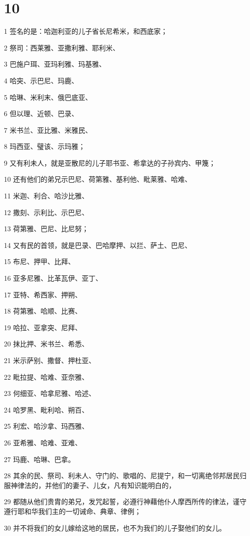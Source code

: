 \chapter{10}

\par 1 签名的是：哈迦利亚的儿子省长尼希米，和西底家；
\par 2 祭司：西莱雅、亚撒利雅、耶利米、
\par 3 巴施户珥、亚玛利雅、玛基雅、
\par 4 哈突、示巴尼、玛鹿、
\par 5 哈琳、米利末、俄巴底亚、
\par 6 但以理、近顿、巴录、
\par 7 米书兰、亚比雅、米雅民、
\par 8 玛西亚、璧该、示玛雅；
\par 9 又有利未人，就是亚散尼的儿子耶书亚、希拿达的子孙宾内、甲篾；
\par 10 还有他们的弟兄示巴尼、荷第雅、基利他、毗莱雅、哈难、
\par 11 米迦、利合、哈沙比雅、
\par 12 撒刻、示利比、示巴尼、
\par 13 荷第雅、巴尼、比尼努；
\par 14 又有民的首领，就是巴录、巴哈摩押、以拦、萨土、巴尼、
\par 15 布尼、押甲、比拜、
\par 16 亚多尼雅、比革瓦伊、亚丁、
\par 17 亚特、希西家、押朔、
\par 18 荷第雅、哈顺、比赛、
\par 19 哈拉、亚拿突、尼拜、
\par 20 抹比押、米书兰、希悉、
\par 21 米示萨别、撒督、押杜亚、
\par 22 毗拉提、哈难、亚奈雅、
\par 23 何细亚、哈拿尼雅、哈述、
\par 24 哈罗黑、毗利哈、朔百、
\par 25 利宏、哈沙拿、玛西雅、
\par 26 亚希雅、哈难、亚难、
\par 27 玛鹿、哈琳、巴拿。
\par 28 其余的民、祭司、利未人、守门的、歌唱的、尼提宁，和一切离绝邻邦居民归服神律法的，并他们的妻子、儿女，凡有知识能明白的，
\par 29 都随从他们贵胄的弟兄，发咒起誓，必遵行神藉他仆人摩西所传的律法，谨守遵行耶和华我们主的一切诫命、典章、律例；
\par 30 并不将我们的女儿嫁给这地的居民，也不为我们的儿子娶他们的女儿。
